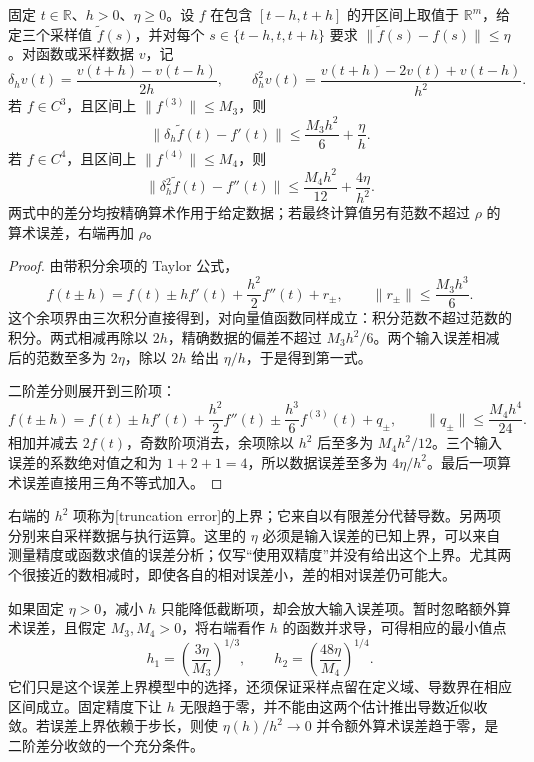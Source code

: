 \begin{proposition}\label{g1:prop:central-difference-error}
	固定 \(t\in\mathbb R\)、\(h>0\)、\(\eta\ge0\)。设 \(f\) 在包含 \([t-h,t+h]\) 的开区间上取值于 \(\mathbb R^m\)，给定三个采样值 \(\widetilde f(s)\)，并对每个 \(s\in\{t-h,t,t+h\}\) 要求 \(\|\widetilde f(s)-f(s)\|\le\eta\)。对函数或采样数据 \(v\)，记
	\[
		\delta_h v(t)=\frac{v(t+h)-v(t-h)}{2h},\qquad
		\delta_h^2v(t)=\frac{v(t+h)-2v(t)+v(t-h)}{h^2}.
	\]
	若 \(f\in C^3\)，且区间上 \(\|f^{(3)}\|\le M_3\)，则
	\begin{equation}\label{g1:eq:first-difference-error}
		\|\delta_h\widetilde f(t)-f'(t)\|
		\le\frac{M_3h^2}{6}+\frac\eta h.
	\end{equation}
	若 \(f\in C^4\)，且区间上 \(\|f^{(4)}\|\le M_4\)，则
	\begin{equation}\label{g1:eq:second-difference-error}
		\|\delta_h^2\widetilde f(t)-f''(t)\|
		\le\frac{M_4h^2}{12}+\frac{4\eta}{h^2}.
	\end{equation}
	两式中的差分均按精确算术作用于给定数据；若最终计算值另有范数不超过 \(\rho\) 的算术误差，右端再加 \(\rho\)。
\end{proposition}
\begin{proof}
	由带积分余项的 Taylor 公式，
	\[
		f(t\pm h)=f(t)\pm hf'(t)+\frac{h^2}{2}f''(t)+r_\pm,
		\qquad \|r_\pm\|\le\frac{M_3h^3}{6}.
	\]
	这个余项界由三次积分直接得到，对向量值函数同样成立：积分范数不超过范数的积分。两式相减再除以 \(2h\)，精确数据的偏差不超过 \(M_3h^2/6\)。两个输入误差相减后的范数至多为 \(2\eta\)，除以 \(2h\) 给出 \(\eta/h\)，于是得到第一式。

	二阶差分则展开到三阶项：
	\[
		f(t\pm h)=f(t)\pm hf'(t)+\frac{h^2}{2}f''(t)
		\pm\frac{h^3}{6}f^{(3)}(t)+q_\pm,
		\qquad \|q_\pm\|\le\frac{M_4h^4}{24}.
	\]
	相加并减去 \(2f(t)\)，奇数阶项消去，余项除以 \(h^2\) 后至多为 \(M_4h^2/12\)。三个输入误差的系数绝对值之和为 \(1+2+1=4\)，所以数据误差至多为 \(4\eta/h^2\)。最后一项算术误差直接用三角不等式加入。
\end{proof}

右端的 \(h^2\) 项称为[truncation error]的上界；它来自以有限差分代替导数。另两项分别来自采样数据与执行运算。这里的 \(\eta\) 必须是输入误差的已知上界，可以来自测量精度或函数求值的误差分析；仅写“使用双精度”并没有给出这个上界。尤其两个很接近的数相减时，即使各自的相对误差小，差的相对误差仍可能大。

\ProseParagraphBreak

如果固定 \(\eta>0\)，减小 \(h\) 只能降低截断项，却会放大输入误差项。暂时忽略额外算术误差，且假定 \(M_3,M_4>0\)，将右端看作 \(h\) 的函数并求导，可得相应的最小值点
\[
	h_1=\left(\frac{3\eta}{M_3}\right)^{1/3},\qquad
	h_2=\left(\frac{48\eta}{M_4}\right)^{1/4}.
\]
它们只是这个误差上界模型中的选择，还须保证采样点留在定义域、导数界在相应区间成立。固定精度下让 \(h\) 无限趋于零，并不能由这两个估计推出导数近似收敛。若误差上界依赖于步长，则使 \(\eta(h)/h^2\to0\) 并令额外算术误差趋于零，是二阶差分收敛的一个充分条件。

